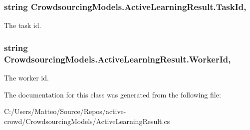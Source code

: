\subsubsection[{Task\+Id}]{\setlength{\rightskip}{0pt plus 5cm}string Crowdsourcing\+Models.\+Active\+Learning\+Result.\+Task\+Id\hspace{0.3cm}{\ttfamily [get]}, {\ttfamily [set]}}\label{class_crowdsourcing_models_1_1_active_learning_result_aa64ee320de4115d144c1828eb0ad0f35}


The task id. 

\hypertarget{class_crowdsourcing_models_1_1_active_learning_result_a571a628b29d15458681a4536c0ddda8f}{}
\subsubsection[{Worker\+Id}]{\setlength{\rightskip}{0pt plus 5cm}string Crowdsourcing\+Models.\+Active\+Learning\+Result.\+Worker\+Id\hspace{0.3cm}{\ttfamily [get]}, {\ttfamily [set]}}\label{class_crowdsourcing_models_1_1_active_learning_result_a571a628b29d15458681a4536c0ddda8f}


The worker id. 



The documentation for this class was generated from the following file\+:\begin{DoxyCompactItemize}
\item 
C\+:/\+Users/\+Matteo/\+Source/\+Repos/active-\/crowd/\+Crowdsourcing\+Models/Active\+Learning\+Result.\+cs\end{DoxyCompactItemize}

